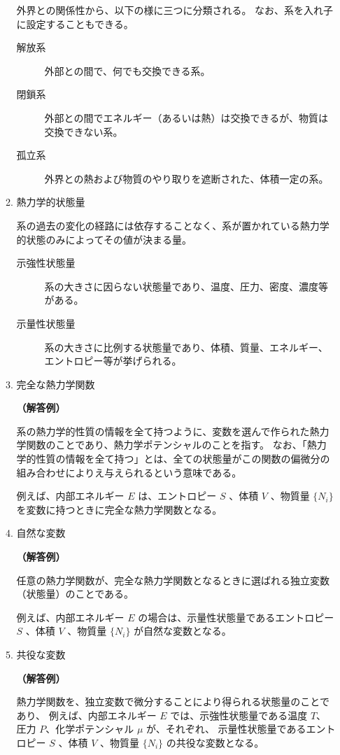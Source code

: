 \documentclass[uplatex,dvipdfmx,a4paper,11pt]{jsarticle}
\begin{document}
\begin{appendix}
\begin{enumerate}
\begin{enumerate}
外界との関係性から、以下の様に三つに分類される。
なお、系を入れ子に設定することもできる。

\begin{description}
\item[解放系]
外部との間で、何でも交換できる系。
\item[閉鎖系]
外部との間でエネルギー（あるいは熱）は交換できるが、物質は交換できない系。
\item[孤立系]
外界との熱および物質のやり取りを遮断された、体積一定の系。
\end{description}

\item
熱力学的状態量

系の過去の変化の経路には依存することなく、系が置かれている熱力学的状態のみによってその値が決まる量。

\begin{description}
\item[示強性状態量]
系の大きさに因らない状態量であり、温度、圧力、密度、濃度等がある。
\item[示量性状態量]
系の大きさに比例する状態量であり、体積、質量、エネルギー、エントロピー等が挙げられる。
\end{description}


\item
完全な熱力学関数

{\bf （解答例）} 

系の熱力学的性質の情報を全て持つように、変数を選んで作られた熱力学関数のことであり、熱力学ポテンシャルのことを指す。
なお、「熱力学的性質の情報を全て持つ」とは、全ての状態量がこの関数の偏微分の組み合わせによりえ与えられるという意味である。

例えば、内部エネルギー $E$ は、エントロピー $S$ 、体積 $V$ 、物質量 $\{ N_i \}$ を変数に持つときに完全な熱力学関数となる。 

\item
自然な変数

{\bf （解答例）} 

任意の熱力学関数が、完全な熱力学関数となるときに選ばれる独立変数（状態量）のことである。

例えば、内部エネルギー $E$ の場合は、示量性状態量であるエントロピー $S$ 、体積 $V$ 、物質量 $\{ N_i \}$ が自然な変数となる。 

\item
共役な変数

{\bf （解答例）} 

熱力学関数を、独立変数で微分することにより得られる状態量のことであり、
例えば、内部エネルギー $E$ では、示強性状態量である温度 $T$、圧力 $P$、化学ポテンシャル $\mu$ が、それぞれ、 示量性状態量であるエントロピー $S$ 、体積 $V$ 、物質量 $\{ N_i \}$ の共役な変数となる。


\end{enumerate}
\end{enumerate}
\end{appendix}
\end{document}
